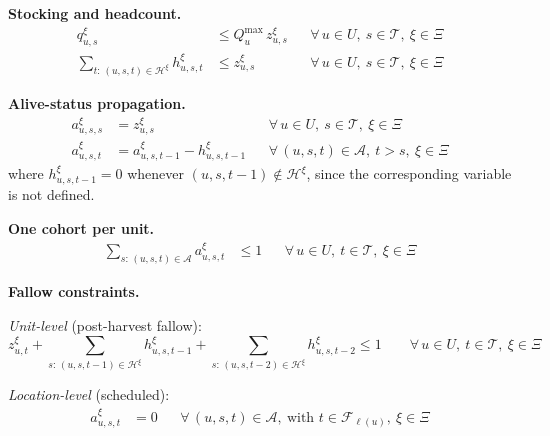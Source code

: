\documentclass[12pt,a4paper]{article}
\begin{document}
\noindent \textbf{Stocking and headcount.}
\begin{align}
  q^\xi_{u,s} &\leq Q^{\max}_{u}\, z^\xi_{u,s}
    && \forall\, u \in U,\ s \in \mathcal{T},\ \xi \in \Xi \label{eq:C1} \\
  \sum_{t:\,(u,s,t)\in \mathcal{H}^\xi} h^\xi_{u,s,t} &\le z^\xi_{u,s}
    && \forall\, u \in U,\ s \in \mathcal{T},\ \xi \in \Xi \label{eq:C2}
\end{align}
 
 
\noindent \textbf{Alive-status propagation.}
\begin{align}
  a^\xi_{u,s,s} &= z^\xi_{u,s}
    && \forall\, u \in U,\ s \in \mathcal{T},\ \xi \in \Xi \label{eq:C3a}\\
  a^\xi_{u,s,t} &= a^\xi_{u,s,t-1} - h^\xi_{u,s,t-1}
    && \forall\, (u,s,t) \in \mathcal{A},\ t > s,\ \xi \in \Xi \label{eq:C3b}
\end{align}
where $h^\xi_{u,s,t-1} = 0$ whenever $(u,s,t{-}1) \notin \mathcal{H}^\xi$, since the corresponding variable is not defined.
 
\noindent \textbf{One cohort per unit.}
\begin{align}
  \sum_{s:\,(u,s,t)\in \mathcal{A}} a^\xi_{u,s,t} &\leq 1
    && \forall\, u \in U,\ t \in \mathcal{T},\ \xi \in \Xi \label{eq:C4}
\end{align}
 
 
\noindent \textbf{Fallow constraints.}
 
\noindent\emph{Unit-level} (post-harvest fallow):
\begin{equation}
  z^\xi_{u,t}
  + \sum_{s:\,(u,s,t{-}1)\in \mathcal{H}^\xi} h^\xi_{u,s,t-1}
  + \sum_{s:\,(u,s,t{-}2)\in \mathcal{H}^\xi} h^\xi_{u,s,t-2}
  \leq 1
  \qquad \forall\, u \in U,\ t \in \mathcal{T},\ \xi \in \Xi \label{eq:C5_compact}
\end{equation}
 
 \noindent\emph{Location-level} (scheduled):
\begin{align}
  a^\xi_{u,s,t} &= 0
    && \forall\, (u,s,t) \in \mathcal{A},\ \text{with } t \in \mathcal{F}_{\ell(u)},\ \xi \in \Xi \label{eq:C6}
\end{align}
 
\end{document}
